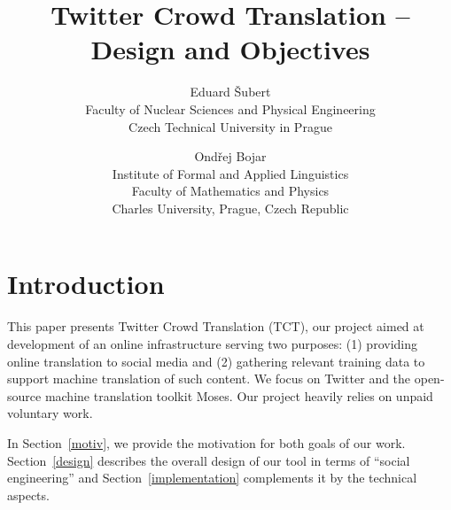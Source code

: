 \documentclass[11pt]{article}
\begin{document}
\title{\textbf{Twitter Crowd Translation -- Design and Objectives}}
\author{
Eduard \v{S}ubert\\
Faculty of Nuclear Sciences and Physical Engineering\\
Czech Technical University in Prague
\and
Ond\v{r}ej Bojar\\
Institute of Formal and Applied Linguistics\\
Faculty of Mathematics and Physics\\
Charles University, Prague, Czech Republic
}

\renewcommand{\today}{June 20, 2014}
\maketitle

\def\footurl#1{\footnote{\tt{} #1}}
\def\equo#1{``#1''}

\def\hashtag#1{\texttt{\##1}}

\def\Sref#1{Section~\ref{#1}}
\def\Fref#1{Figure~\ref{#1}}

\maketitle
%
\section{Introduction}

This paper presents Twitter Crowd Translation (TCT), our project aimed at
development of an online infrastructure serving two
purposes:
(1) providing online translation to social media and (2)
gathering relevant training data to support machine translation of such content.
We focus on Twitter and the open-source machine translation toolkit
Moses. Our project heavily relies on unpaid voluntary work.

In \Sref{motiv}, we provide the motivation for both goals of our work.
\Sref{design} describes the overall design of our tool in terms of
\equo{social engineering} and \Sref{implementation} complements it by the
technical aspects.

%
\end{document}
